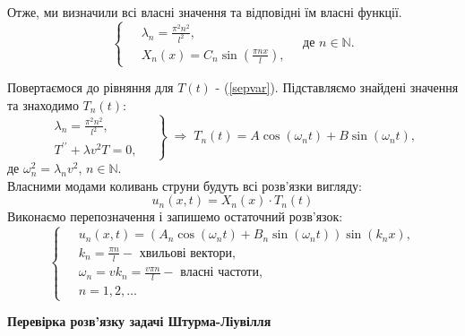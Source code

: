 \documentclass[a4paper, 14pt]{extreport}
\begin{document}
Отже, ми визначили всі власні значення та відповідні їм власні функції.
    \begin{equation} \label{ShLsol}
        \left\{ \begin{aligned}
            \;&\lambda_n = \frac{\pi^2 n^2}{l^2},\\ 
            &X_n(x) = C_n \sin\left(\frac{\pi n x}{l}\right),
        \end{aligned} \right.
        \quad \text{де } n \in \mathbb{N}.
    \end{equation}
    
Повертаємося до рівняння для $T(t)$ - (\ref{sepvar}). Підставляємо знайдені значення та знаходимо $T_n(t)$:
\begin{equation*}
    \left. \begin{aligned}
        \lambda_n = \frac{\pi^2 n^2}{l^2},&\;\\ 
        T^{\prime\prime} + \lambda v^2T = 0,&
    \end{aligned} \right\}
    \;\Rightarrow\;
    T_n(t) = A\cos(\omega_n t) + B\sin(\omega_n t),
\end{equation*}
де $\omega_n^2 = \lambda_n v^2, \, n \in \mathbb{N}.$\\
Власними модами коливань струни будуть всі розв'язки вигляду:
\begin{equation*}
    u_n(x,t) = X_n(x) \cdot T_n(t)
\end{equation*}
Виконаємо перепозначення і запишемо остаточний розв'язок:
\begin{equation}
    \left\{ \begin{aligned}
        \;&u_n(x,t) = \left(A_n\cos(\omega_n t) + B_n\sin(\omega_n t)\right) \sin(k_n x), \\
        &k_n = \frac{\pi n}{l} - \text{ хвильові вектори}, \\
        &\omega_n = vk_n = \frac{v \pi n}{l} - \text{ власні частоти}, \\
        &n = 1, 2,\ldots
    \end{aligned}\right.
\end{equation}
\newpage

\begin{center}
    \large{\textbf{Перевірка розв'язку задачі Штурма-Ліувілля}}
\end{center}
\end{document}
